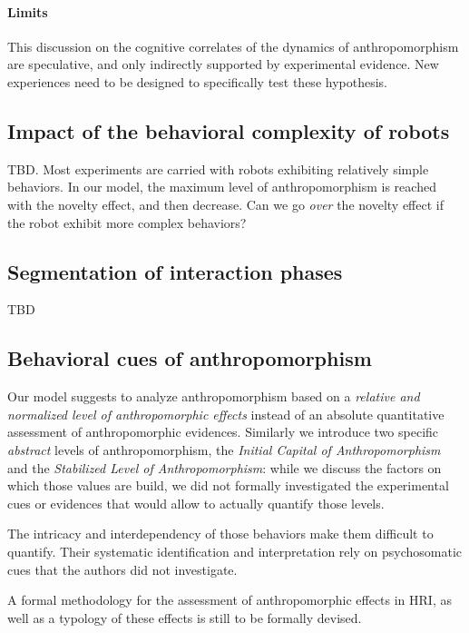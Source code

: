 \documentclass{frontiersSCNS} %
\begin{document}
\paragraph{Limits} This discussion on the cognitive correlates of the dynamics
of anthropomorphism are speculative, and only indirectly supported by
experimental evidence. New experiences need to be designed to specifically test
these hypothesis.


\subsection{Impact of the behavioral complexity of robots}

TBD. Most experiments are carried with robots exhibiting relatively simple
behaviors. In our model, the maximum level of anthropomorphism is reached with
the novelty effect, and then decrease. Can we go \emph{over} the novelty effect
if the robot exhibit more complex behaviors?

\subsection{Segmentation of interaction phases}

TBD

\subsection{Behavioral cues of anthropomorphism}
\label{sec:behavioralcues}

Our model suggests to analyze anthropomorphism based on a \emph{relative and
normalized level of anthropomorphic effects} instead of an absolute
quantitative assessment of anthropomorphic evidences. Similarly we introduce
two specific \emph{abstract} levels of anthropomorphism, the \emph{Initial
Capital of Anthropomorphism} and the \emph{Stabilized Level of
Anthropomorphism}: while we discuss the factors on which those values are
build, we did not formally investigated the experimental cues or evidences
that would allow to actually quantify those levels.

The intricacy and interdependency of those behaviors make them difficult to
quantify.  Their systematic identification and interpretation rely on
psychosomatic cues that the authors did not investigate.

A formal methodology for the assessment of anthropomorphic effects in HRI, as
well as a typology of these effects is still to be formally devised.
\end{document}
